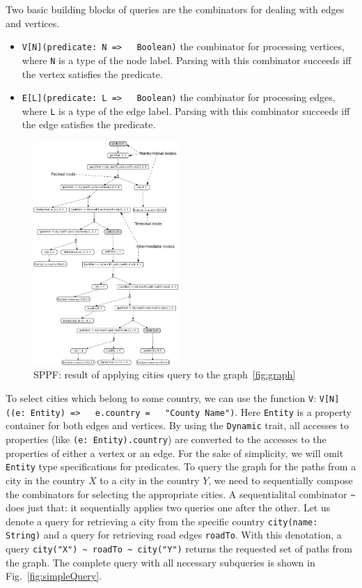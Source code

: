 Two basic building blocks of queries are the combinators for dealing with edges and vertices.
\begin{itemize}
    \item \lstinline{V[N](predicate: N =>   Boolean)} the combinator for processing vertices, where \lstinline{N} is a type of the node label.
    Parsing with this combinator succeeds iff the vertex satisfies the predicate.
    \item \lstinline{E[L](predicate: L =>   Boolean)} the combinator for processing edges, where \lstinline{L} is a type of the edge label.
    Parsing with this combinator succeeds iff the edge satisfies the predicate.
\end{itemize}

\begin{figure}[h]
\includegraphics[width=0.49\textwidth]{sppf}
\caption{SPPF: result of applying cities query to the graph~\ref{fig:graph}}
\label{fig:sppf}
\end{figure}

To select cities which belong to some country, we can use the function \lstinline{V}: \lstinline{V[N]((e: Entity) =>   e.country =   "County Name")}.
Here \lstinline{Entity} is a property container for both edges and vertices.
By using the \lstinline{Dynamic} trait, all accesses to properties (like \lstinline{(e: Entity).country}) are converted to the accesses to the properties of either a vertex or an edge.
For the sake of simplicity, we will omit \lstinline{Entity} type specifications for predicates.
To query the graph for the paths from a city in the country $X$ to a city in the country $Y$, we need to sequentially compose the combinators for selecting the appropriate cities.
A sequentialital combinator \lstinline{~} does just that: it sequentially  applies two queries one after the other.
Let us denote a query for retrieving a city from the specific country \lstinline{city(name: String)} and a query for retrieving road edges \lstinline{roadTo}.
With this denotation, a query \lstinline{city("X") ~ roadTo ~ city("Y")} returns the requested set of paths from the graph.
The complete query with all necessary subqueries is shown in Fig.~\ref{fig:simpleQuery}.

